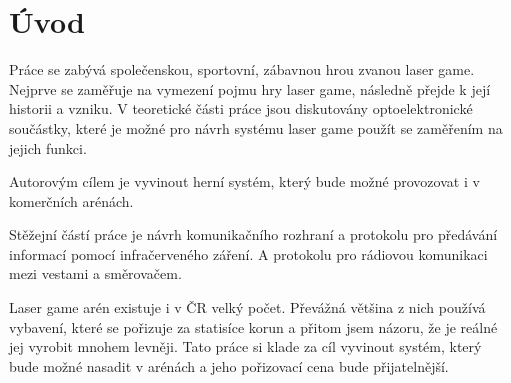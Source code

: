 \chapter*{Úvod}
{}


Práce se zabývá společenskou, sportovní, zábavnou hrou zvanou laser game. Nejprve se zaměřuje na vymezení pojmu hry laser game, následně přejde k její historii a vzniku. V teoretické části práce jsou diskutovány optoelektronické součástky, které je možné pro návrh systému laser game použít se zaměřením na jejich funkci.

Autorovým cílem je vyvinout herní systém, který bude možné provozovat i v komerčních arénách.

Stěžejní částí práce je návrh komunikačního rozhraní a protokolu pro předávání informací pomocí infračerveného záření. A protokolu pro rádiovou komunikaci mezi vestami a směrovačem.

Laser game arén existuje i v ČR velký počet. Převážná většina z nich používá vybavení, které se pořizuje za statisíce korun a přitom jsem názoru, že je reálné jej vyrobit mnohem levněji. Tato práce si klade za cíl vyvinout systém, který bude možné nasadit v arénách a jeho pořizovací cena bude přijatelnější.
